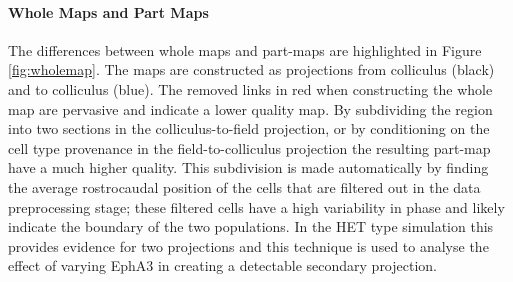 \paragraph{Whole Maps and Part Maps}
The differences between whole maps and part-maps are highlighted in Figure \ref{fig:wholemap}. The maps are constructed as projections from colliculus (black) and to colliculus (blue). The removed links in red when constructing the whole map are pervasive and indicate a lower quality map. By subdividing the region into two sections in the colliculus-to-field projection, or by conditioning on the cell type provenance in the field-to-colliculus projection the resulting part-map have a much higher quality. This subdivision is made automatically by finding the average rostrocaudal position of the cells that are filtered out in the data preprocessing stage; these filtered cells have a high variability in phase and likely indicate the boundary of the two populations. In the HET type simulation this provides evidence for two projections and this technique is used to analyse the effect of varying EphA3 in creating a detectable secondary projection.


